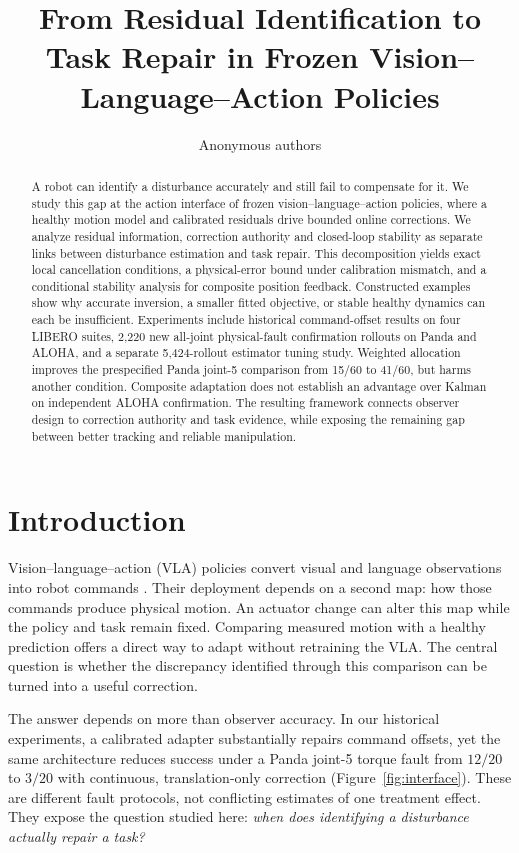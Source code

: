 \documentclass{article}
\title{From Residual Identification to Task Repair in Frozen Vision--Language--Action Policies}
\author{Anonymous authors}
\begin{document}
\maketitle

\begin{abstract}
A robot can identify a disturbance accurately and still fail to compensate for it.
We study this gap at the action interface of frozen vision--language--action policies,
where a healthy motion model and calibrated residuals drive bounded online corrections.
We analyze residual information, correction authority and closed-loop stability as separate
links between disturbance estimation and task repair.
This decomposition yields exact local cancellation conditions, a physical-error bound under
calibration mismatch, and a conditional stability analysis for composite position feedback.
Constructed examples show why accurate inversion, a smaller fitted objective, or stable
healthy dynamics can each be insufficient.
Experiments include historical command-offset results on four LIBERO suites, 2,220 new
all-joint physical-fault confirmation rollouts on Panda and ALOHA, and a separate 5,424-rollout
estimator tuning study. Weighted allocation improves the prespecified Panda joint-5 comparison
from 15/60 to 41/60, but harms another condition. Composite adaptation does not establish an
advantage over Kalman on independent ALOHA confirmation. The resulting framework connects
observer design to correction authority and task evidence, while exposing the remaining
gap between better tracking and reliable manipulation.
\end{abstract}

\section{Introduction}
\label{sec:introduction}
Vision--language--action (VLA) policies convert visual and language observations into robot
commands \citep{pi0,pi05,openvla,groot}. Their deployment depends on a second map: how those
commands produce physical motion. An actuator change can alter this map while the policy
and task remain fixed. Comparing measured motion with a healthy prediction offers a direct
way to adapt without retraining the VLA. The central question is whether the discrepancy
identified through this comparison can be turned into a useful correction.

The answer depends on more than observer accuracy. In our historical experiments, a
calibrated adapter substantially repairs command offsets, yet the same architecture reduces
success under a Panda joint-5 torque fault from $12/20$ to $3/20$ with continuous,
translation-only correction (Figure~\ref{fig:interface}). These are different fault protocols,
not conflicting estimates of one treatment effect. They expose the question studied here:
\emph{when does identifying a disturbance actually repair a task?}
\end{document}
